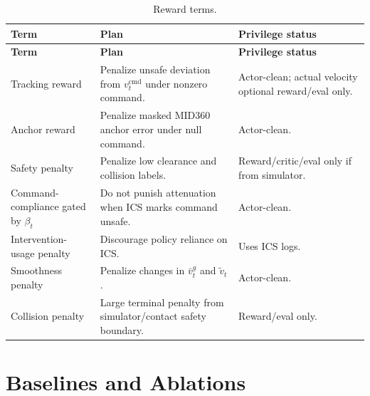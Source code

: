 \documentclass[11pt]{article}
\newcommand{\vcmd}{v^{\mathrm{cmd}}_t}
\newcommand{\vgov}{\bar v^g_t}
\newcommand{\vfin}{\tilde v_t}
\begin{document}
\begin{longtable}{@{}L{0.28\textwidth}L{0.44\textwidth}L{0.18\textwidth}@{}}
\caption{Reward terms.}\\
\toprule
\textbf{Term} & \textbf{Plan} & \textbf{Privilege status} \\
\midrule
\endfirsthead
\toprule
\textbf{Term} & \textbf{Plan} & \textbf{Privilege status} \\
\midrule
\endhead
Tracking reward & Penalize unsafe deviation from \(\vcmd\) under nonzero command. & Actor-clean; actual velocity optional reward/eval only. \\
Anchor reward & Penalize masked MID360 anchor error under null command. & Actor-clean. \\
Safety penalty & Penalize low clearance and collision labels. & Reward/critic/eval only if from simulator. \\
Command-compliance gated by \(\beta_t\) & Do not punish attenuation when ICS marks command unsafe. & Actor-clean. \\
Intervention-usage penalty & Discourage policy reliance on ICS. & Uses ICS logs. \\
Smoothness penalty & Penalize changes in \(\vgov\) and \(\vfin\). & Actor-clean. \\
Collision penalty & Large terminal penalty from simulator/contact safety boundary. & Reward/eval only. \\
\bottomrule
\end{longtable}

\section{Baselines and Ablations}
\end{document}
